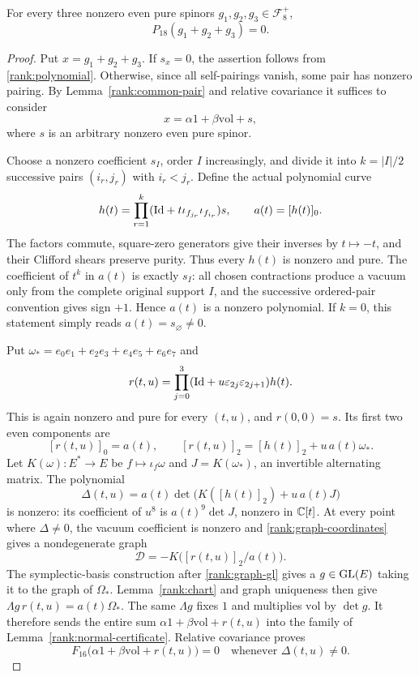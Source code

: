 \begin{proposition}\label{rank:three-vanishing}
For every three nonzero even pure spinors $g_1,g_2,g_3\in\mathcal F_8^+$,
\[
 P_{18}(g_1+g_2+g_3)=0.
\]
\end{proposition}
\begin{proof}
Put $x=g_1+g_2+g_3$. If $s_x=0$, the assertion follows from
\eqref{rank:polynomial}. Otherwise, since all self-pairings vanish,
some pair has nonzero pairing. By Lemma~\ref{rank:common-pair} and
relative covariance it suffices to consider
\[
 x=\alpha1+\beta\mathrm{vol}+s,
\]
where $s$ is an arbitrary nonzero even pure spinor.

Choose a nonzero coefficient $s_I$, order $I$ increasingly, and divide it
into $k=|I|/2$ successive pairs $(i_r,j_r)$ with $i_r<j_r$.
Define the actual polynomial curve
\begin{equation}
 h(t)=\prod_{r=1}^k(\mathrm{Id}+t\iota_{f_{j_r}}\iota_{f_{i_r}})s,
 \qquad a(t)=[h(t)]_0.
 \label{rank:curve-first}
\end{equation}
The factors commute, square-zero generators give their inverses by
$t\mapsto-t$, and their Clifford shears preserve purity. Thus every
$h(t)$ is nonzero and pure. The coefficient of $t^k$ in $a(t)$ is
exactly $s_I$: all chosen contractions produce a vacuum only from the
complete original support $I$, and the successive ordered-pair convention
gives sign $+1$. Hence $a(t)$ is a nonzero polynomial. If $k=0$, this
statement simply reads $a(t)=s_\varnothing\ne0$.

Put $\omega_*=e_0e_1+e_2e_3+e_4e_5+e_6e_7$ and
\begin{equation}
 r(t,u)=\prod_{j=0}^3(\mathrm{Id}+u\varepsilon_{2j}\varepsilon_{2j+1})h(t).
 \label{rank:curve-second}
\end{equation}
This is again nonzero and pure for every $(t,u)$, and $r(0,0)=s$.
Its first two even components are
\[
 [r(t,u)]_0=a(t),\qquad [r(t,u)]_2=[h(t)]_2+u\,a(t)\omega_*.
\]
Let $K(\omega):E^*\to E$ be $f\mapsto\iota_f\omega$ and
$J=K(\omega_*)$, an invertible alternating matrix. The polynomial
\begin{equation}
 \Delta(t,u)=a(t)\det\bigl(K([h(t)]_2)+u\,a(t)J\bigr)
 \label{rank:discriminant}
\end{equation}
is nonzero: its coefficient of $u^8$ is $a(t)^9\det J$, nonzero in
$\mathbb C[t]$. At every point where $\Delta\ne0$, the vacuum coefficient is
nonzero and \eqref{rank:graph-coordinates} gives a nondegenerate graph
\[
 \mathcal D=-K\bigl([r(t,u)]_2/a(t)\bigr).
\]
The symplectic-basis construction after \eqref{rank:graph-gl} gives a
$g\in\operatorname{GL}(E)$ taking it to the graph of $\Omega_*$.
Lemma~\ref{rank:chart} and graph uniqueness then give
$\Lambda g\,r(t,u)=a(t)\Omega_*$.
The same $\Lambda g$ fixes $1$ and multiplies $\mathrm{vol}$ by $\det g$.
It therefore sends the entire sum
$\alpha1+\beta\mathrm{vol}+r(t,u)$ into the family of
Lemma~\ref{rank:normal-certificate}. Relative covariance proves
\[
 F_{16}\bigl(\alpha1+\beta\mathrm{vol}+r(t,u)\bigr)=0
 \quad\text{whenever }\Delta(t,u)\ne0.
\]


\end{proof}
